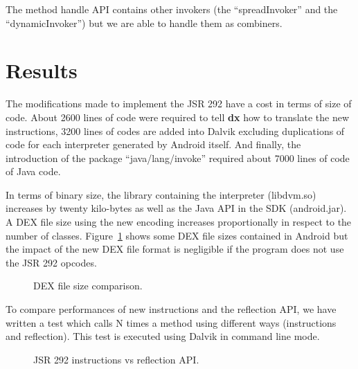 \documentclass{sig-alternate}
\def \DALVIK{Dalvik\xspace}
\def \Jsr{JSR\xspace}
\def \JSR{\Jsr 292\xspace}
\def \ANDROID{Android\xspace}
\newcommand{\fixme}[1]{{\color{red}FIXME #1}}
\begin{document}
      The method handle API contains other invokers (the ``spreadInvoker'' and the ``dynamicInvoker'')
      but we are able to handle them as combiners.

\section{Results}
 \label{result}

  The modifications made to implement the \JSR have a cost in terms of size of code.
  About 2600 lines of code were required to tell {\bf dx} how to translate the new instructions,
  3200 lines of codes are added into Dalvik excluding duplications of code for each interpreter generated by \ANDROID itself.
  And finally, the introduction of the package ``java/lang/invoke'' required about 7000 lines of code of Java code.


  In terms of binary size, the library containing the interpreter (libdvm.so) increases by twenty kilo-bytes
  as well as the Java API in the SDK (android.jar).
  A DEX file size using the new encoding increases proportionally in respect to the number of classes.
  Figure~\ref{Rsize} shows some DEX file sizes contained in \ANDROID but
  the impact of the new DEX file format is negligible if the program does not use the \JSR opcodes.

  \begin{figure}[!ht]
    \dataset
    \resizebox{.9\linewidth}{!}{}
    \caption{DEX file size comparison.}
    \label{Rsize}
  \end{figure}

  To compare performances of new instructions and the reflection API,
  we have written a test which calls N times a method using different ways (instructions and reflection).
  This test is executed using \DALVIK in command line mode.

  \begin{figure}[!ht]
    \resizebox{\linewidth}{!}{}
    \caption{JSR 292 instructions vs reflection API.}
    \label{Rinvoke}
  \end{figure}
\end{document}
